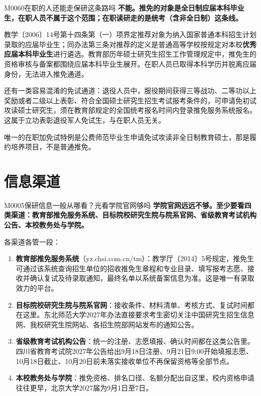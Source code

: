 \begin{qa}{M0060}{在职的人还能走保研这条路吗}
\textbf{不能。推免的对象是全日制应届本科毕业生，在职人员不属于这个范围；在职读研走的是统考（含非全日制）这条线。}

教学〔2006〕14号第十四条第（一）项界定推荐对象为纳入国家普通本科招生计划录取的应届毕业生；同办法第三条对推荐的定义是普通高等学校按规定对本校\textbf{优秀应届本科毕业生}进行遴选。教育部历年硕士研究生招生工作管理规定中，推免生的资格审核与备案都围绕应届本科毕业生展开。在职人员已取得本科学历并脱离应届身份，无法进入推免通道。

还有一类容易混淆的免试通道：退役人员中，服役期间获得三等战功、二等功以上奖励或者二级以上表彰、符合全国硕士研究生招生考试报考条件的，可申请免初试攻读硕士研究生，须在教育部规定的全国统考报名时间内登录推免服务系统报名。这属于立功表彰退役军人免试生，与在职人员无关。

唯一的在职加免试特例是公费师范毕业生申请免试攻读非全日制教育硕士，那是履约培养项目，不是普通推免。
\end{qa}

\section{信息渠道}
\begin{qa}{M0005}{保研信息一般从哪看？光看学院官网够吗}
\textbf{学院官网远远不够。至少要看四类渠道：教育部推免服务系统、目标院校研究生院与院系官网、省级教育考试机构公告、本校教务处与学院。}

各渠道各管一段：

\begin{enumerate}
  \item \textbf{教育部推免服务系统}（yz.chsi.com.cn/tm）：教学厅〔2014〕5号规定，推免生可通过该系统查询招生单位的招收推免生章程和专业目录、填写报考志愿、接收并确认复试及待录取通知，最终名单以系统备案信息为准。这是唯一有录取效力的平台。
  \item \textbf{目标院校研究生院与院系官网}：接收条件、材料清单、考核方式、复试时间都在这里。东北师范大学2027年办法直接要求考生密切关注中国研究生招生信息网、我校研究生院网站、各招生院部网站发布的通知公告。
  \item \textbf{省级教育考试机构公告}：统一的注册、志愿填报、确认时间都在这类公告里。四川省教育考试院2027年公告给出9月18日注册、9月21日9:00开始填报志愿、10月18日截止、10月20日前未落实接收单位不再保留资格等全部节点。
  \item \textbf{本校教务处与学院}：推免资格、排名口径、名额分配出自这里，校内资格申请往往更早，北京大学2027届为9月1日至7日。
\end{enumerate}
\end{qa}

